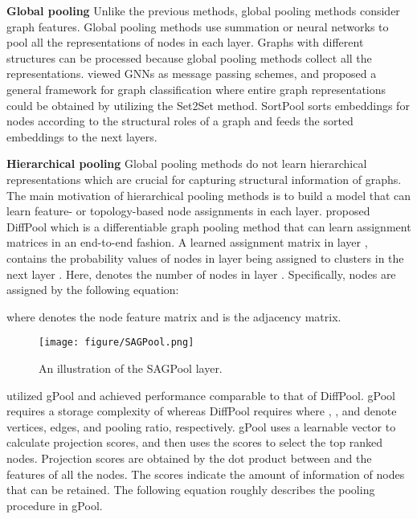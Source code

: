 \documentclass{article}
\begin{document}
\textbf{Global pooling}
Unlike the previous methods, global pooling methods consider graph features. Global pooling methods use summation or neural networks to pool all the representations of nodes in each layer. Graphs with different structures can be processed because global pooling methods collect all the representations.
\citeauthor{DBLP:journals/corr/GilmerSRVD17} viewed GNNs as message passing schemes, and proposed a general framework for graph classification where entire graph representations could be obtained by utilizing the Set2Set\cite{SET2SET} method. SortPool\cite{zhang2018end} sorts embeddings for nodes according to the structural roles of a graph and feeds the sorted embeddings to the next layers. 


\textbf{Hierarchical pooling}
Global pooling methods do not learn hierarchical representations which are crucial for capturing structural information of graphs. The main motivation of hierarchical pooling methods is to build a model that can learn feature- or topology-based node assignments in each layer. \citeauthor{RexYing} proposed DiffPool which is a differentiable graph pooling method that can learn assignment matrices in an end-to-end fashion. A learned assignment matrix in layer ,  contains the probability values of nodes in layer  being assigned to clusters in the next layer . Here,  denotes the number of nodes in layer . Specifically, nodes are assigned by the following equation:


where  denotes the node feature matrix and  is the adjacency matrix.


\begin{figure*}[ht]
\vskip 0.2in
\begin{center}
\centerline{\texttt{[image: figure/SAGPool.png]}}
\caption{An illustration of the SAGPool layer.}
\label{SAGPool}
\end{center}
\vskip -0.2in
\end{figure*}


\citeauthor{cangea2018towards} utilized gPool\cite{gao2019graph} and achieved performance comparable to that of DiffPool. gPool requires a storage complexity of  whereas DiffPool requires   where , , and  denote vertices, edges, and pooling ratio, respectively. gPool uses a learnable vector  to calculate projection scores, and then uses the scores to select the top ranked nodes. Projection scores are obtained by the dot product between  and the features of all the nodes. The scores indicate the amount of information of nodes that can be retained. The following equation roughly describes the pooling procedure in gPool.
\end{document}

